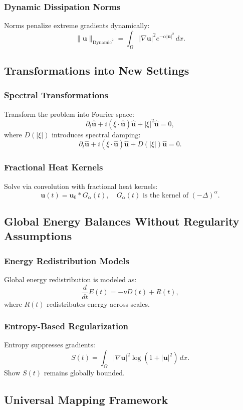 \subsubsection{Dynamic Dissipation Norms}
Norms penalize extreme gradients dynamically:
\[
\|\mathbf{u}\|_{\text{Dynamic}^2} = \int_\Omega |\nabla \mathbf{u}|^2 e^{-\alpha |\mathbf{u}|^2} \, dx.
\]

\subsection{Transformations into New Settings}
\subsubsection{Spectral Transformations}
Transform the problem into Fourier space:
\[
\partial_t \hat{\mathbf{u}} + i (\xi \cdot \hat{\mathbf{u}}) \hat{\mathbf{u}} + |\xi|^2 \hat{\mathbf{u}} = 0,
\]
where $D(|\xi|)$ introduces spectral damping:
\[
\partial_t \hat{\mathbf{u}} + i (\xi \cdot \hat{\mathbf{u}}) \hat{\mathbf{u}} + D(|\xi|)\hat{\mathbf{u}} = 0.
\]

\subsubsection{Fractional Heat Kernels}
Solve via convolution with fractional heat kernels:
\[
\mathbf{u}(t) = \mathbf{u}_0 * G_\alpha(t), \quad G_\alpha(t) \text{ is the kernel of } (-\Delta)^\alpha.
\]

\subsection{Global Energy Balances Without Regularity Assumptions}
\subsubsection{Energy Redistribution Models}
Global energy redistribution is modeled as:
\[
\frac{d}{dt} E(t) = -\nu D(t) + R(t),
\]
where $R(t)$ redistributes energy across scales.

\subsubsection{Entropy-Based Regularization}
Entropy suppresses gradients:
\[
S(t) = \int_\Omega |\nabla \mathbf{u}|^2 \log(1 + |\mathbf{u}|^2) \, dx.
\]
Show $S(t)$ remains globally bounded.

\subsection{Universal Mapping Framework}
